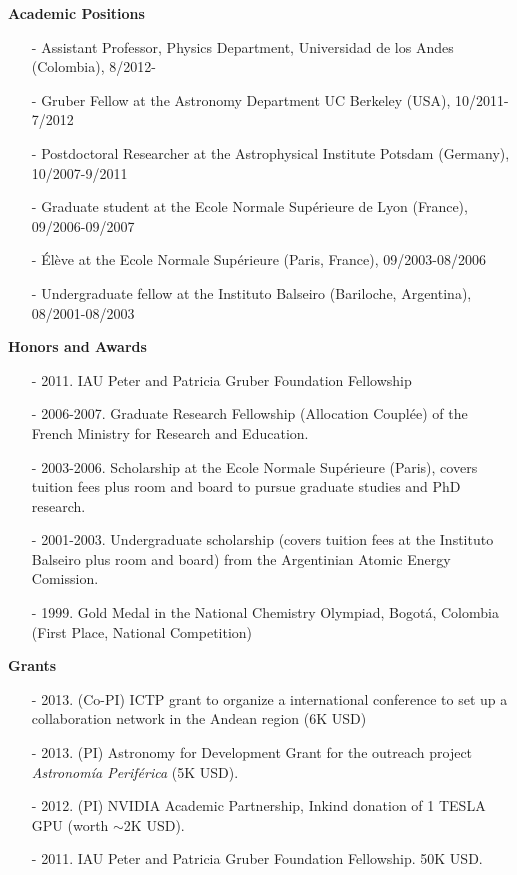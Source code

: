 \documentclass[9pt]{article}
\begin{document}
{\bf Academic Positions}
\begin{itemize}
\item[-] Assistant Professor, Physics Department, Universidad de los Andes (Colombia), 8/2012-
\item[-] Gruber Fellow at the Astronomy Department UC Berkeley (USA), 10/2011-7/2012
\item[-] Postdoctoral Researcher at the Astrophysical Institute Potsdam (Germany), 10/2007-9/2011  
\item[-] Graduate student at the Ecole Normale Sup\'erieure de Lyon (France), 09/2006-09/2007 
\item[-] \'El\`eve at the Ecole Normale Sup\'erieure (Paris, France), 09/2003-08/2006
\item[-] Undergraduate fellow at the Instituto Balseiro (Bariloche, Argentina), 08/2001-08/2003
\end{itemize}

\newpage
{\bf Honors and Awards}
\begin{itemize}
\item[-] 2011. IAU Peter and Patricia Gruber Foundation Fellowship
\item[-] 2006-2007. Graduate Research Fellowship (Allocation Coupl\'ee) of the French
  Ministry for Research and Education.
\item[-] 2003-2006. Scholarship at the Ecole Normale Sup\'erieure (Paris), covers tuition fees plus room and
  board to pursue graduate studies and PhD research.
\item[-] 2001-2003. Undergraduate scholarship (covers tuition fees at the
  Instituto Balseiro plus room and board) from the Argentinian Atomic Energy
  Comission.
\item[-] 1999. Gold Medal in the National Chemistry Olympiad, Bogot\'a,
  Colombia (First Place, National Competition)
\end{itemize}

{\bf Grants}
\begin{itemize}
\item[-] 2013. (Co-PI) ICTP grant to organize a international conference to set up a collaboration network in the Andean region (6K USD)
\item[-] 2013. (PI) Astronomy for Development Grant for the outreach project \emph{Astronom\'ia Perif\'erica} (5K USD).
\item[-] 2012. (PI) NVIDIA Academic Partnership, Inkind donation of 1 TESLA GPU (worth $\sim$2K USD).
\item[-] 2011. IAU Peter and Patricia Gruber Foundation Fellowship. 50K USD.
\end{itemize}
\end{document}
